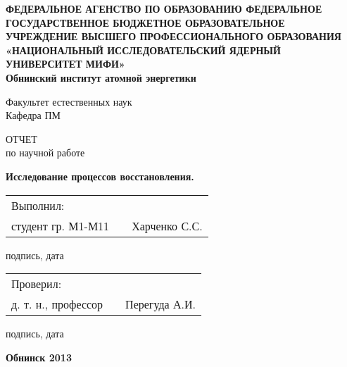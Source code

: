 \begin{titlepage}

\begin{center} \bfseries
ФЕДЕРАЛЬНОЕ АГЕНСТВО ПО ОБРАЗОВАНИЮ
ФЕДЕРАЛЬНОЕ ГОСУДАРСТВЕННОЕ БЮДЖЕТНОЕ ОБРАЗОВАТЕЛЬНОЕ 
УЧРЕЖДЕНИЕ  ВЫСШЕГО ПРОФЕССИОНАЛЬНОГО ОБРАЗОВАНИЯ 
«НАЦИОНАЛЬНЫЙ ИССЛЕДОВАТЕЛЬСКИЙ ЯДЕРНЫЙ УНИВЕРСИТЕТ МИФИ»\\
Обнинский институт атомной энергетики
\\ \vspace{1cm}

Факультет естественных наук\\
Кафедра ПМ
\end{center}
\medskip

\vspace{3cm}

\begin{center}
{\large ОТЧЕТ \\ по научной работе}\\ \vspace{1cm}

{\bfseries Исследование процессов восстановления.}\\
\vspace{2cm}

\end{center}
\vspace{2cm}

\begin{tabular*}{14cm}{p{5cm}p{6cm}r}
Выполнил:\\
студент гр. М1-М11& \underline{\hspace{5cm}} & Харченко С.С.
\end{tabular*}
\begin{center}
подпись, дата
\end{center}

\vspace{1cm}

\begin{tabular*}{14cm}{p{5cm}p{6cm}r}
Проверил:\\
д. т. н., профессор& \underline{\hspace{5cm}} & Перегуда А.И.
\end{tabular*}
\begin{center}
подпись, дата
\end{center}

\vspace{4cm}

\begin{center}
 \bfseries Обнинск 2013
\end{center}

\end{titlepage}